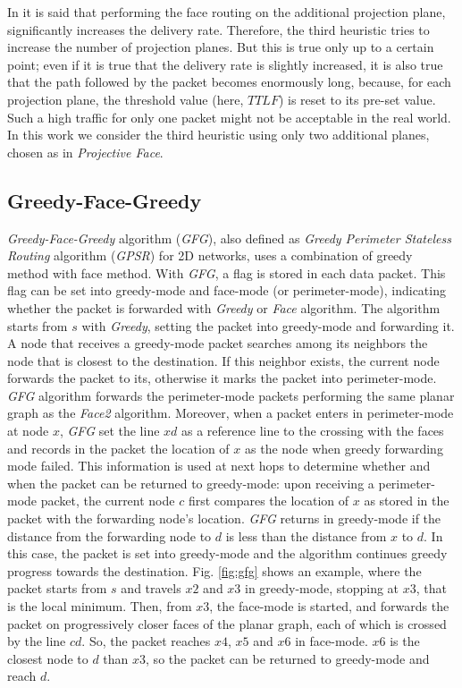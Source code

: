 \documentclass[journal,comsoc]{IEEEtran}
\begin{document}
In \cite{kao:nearly} it is said that performing the face routing on the additional projection plane, significantly increases the delivery rate. Therefore, the third heuristic tries to increase the number of projection planes. But this is true only up to a certain point; even if it is true that the delivery rate is slightly increased, it is also true that the path followed by the packet becomes enormously long, because, for each projection plane, the threshold value (here, \(TTLF\)) is reset to its pre-set value. Such a high traffic for only one packet might not be acceptable in the real world. In this work we consider the third heuristic using only two additional planes, chosen as in \emph{Projective Face}.


\subsection{Greedy-Face-Greedy}
\emph{Greedy-Face-Greedy} algorithm (\emph{GFG}), also defined as \emph{Greedy Perimeter Stateless Routing} algorithm (\emph{GPSR}) for 2D networks, uses a combination of greedy method with face method.
With \emph{GFG}, a flag is stored in each data packet. This flag can be set into greedy-mode and face-mode (or perimeter-mode), indicating whether the packet is forwarded with \emph{Greedy} or \emph{Face} algorithm. The algorithm starts from \(s\) with \emph{Greedy}, setting the packet into greedy-mode and forwarding it. A node that receives a greedy-mode packet searches among its neighbors the node that is closest to the destination. If this neighbor exists, the current node forwards the packet to its, otherwise it marks the packet into perimeter-mode.
\emph{GFG} algorithm forwards the perimeter-mode packets performing the same planar graph as the \emph{Face2} algorithm. Moreover, when a packet enters in perimeter-mode at node \(x\), \emph{GFG} set the line \(xd\) as a reference line to the crossing with the faces and records in the packet the location of \(x\) as the node when greedy forwarding mode failed. This information is used at next hops to determine whether and when the packet can be returned to greedy-mode: upon receiving a perimeter-mode packet, the current node \(c\) first compares the location of \(x\) as stored in the packet with the forwarding node's location. \emph{GFG} returns in greedy-mode if the distance from the forwarding node to \(d\) is less than the distance from \(x\) to \(d\). In this case, the packet is set into greedy-mode and the algorithm continues greedy progress towards the destination. Fig. \ref{fig:gfg} shows an example, where the packet starts from \(s\) and travels \(x2\) and \(x3\) in greedy-mode, stopping at \(x3\), that is the local minimum. Then, from \(x3\), the face-mode is started, and forwards the packet on progressively closer faces of the planar graph, each of which is crossed by the line \(cd\). So, the packet reaches \(x4\), \(x5\) and \(x6\) in face-mode. \(x6\) is the closest node to \(d\) than \(x3\), so the packet can be returned to greedy-mode and reach \(d\).
\end{document}
